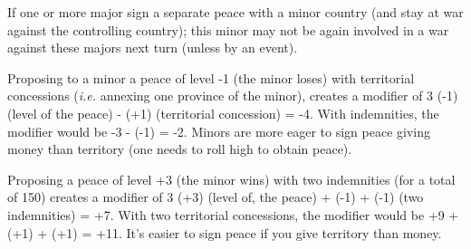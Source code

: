 If one or more major sign a separate peace with a minor country (and stay at
war against the controlling country); this minor may not be again involved in
a war against these majors next turn (unless by an event).

\begin{exemple}
  Proposing to a minor a peace of level -1 (the minor loses) with territorial
  concessions (\emph{i.e.} annexing one province of the minor), creates a
  modifier of 3 \textmultiply (-1) (level of the peace) - (+1) (territorial
  concession) = -4. With indemnities, the modifier would be -3 - (-1) =
  -2. Minors are more eager to sign peace giving money than territory (one
  needs to roll high to obtain peace).

  Proposing a peace of level +3 (the minor wins) with two indemnities (for a
  total of 150\ducats) creates a modifier of 3 \textmultiply (+3) (level of,
  the peace) + (-1) + (-1) (two indemnities) = +7. With two territorial
  concessions, the modifier would be +9 + (+1) + (+1) = +11. It's easier to
  sign peace if you give territory than money.
\end{exemple}


